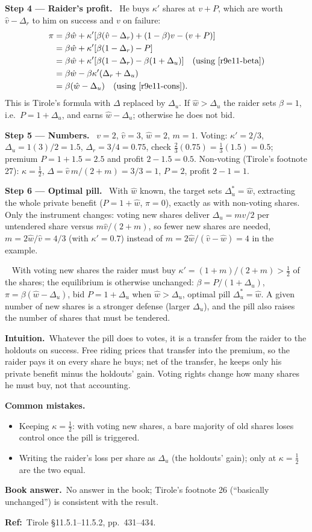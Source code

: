 \documentclass[11pt,a4paper]{article}
\newcommand{\step}[2]{\par\medskip\noindent\textbf{Step #1 --- #2.}~}
\newcommand{\intuition}{\par\medskip\noindent\textbf{Intuition.}~}
\newcommand{\bookans}{\par\medskip\noindent\textbf{Book answer.}~}
\newcommand{\refbib}{\par\smallskip\noindent\textbf{Ref:}~}
\newcommand{\answer}[1]{\par\smallskip\noindent\fbox{\textbf{Answer #1.}}~}
\newcommand{\pitfalls}{\par\medskip\noindent\textbf{Common mistakes.}}
\begin{document}
\step{4}{Raider's profit} He buys $\kappa'$ shares at $v+P$, which are worth $\hat v-\Delta_r$ to him on
success and $v$ on failure:
\begin{align}
  \pi &= \beta\hat w+\kappa'[\beta(\hat v-\Delta_r)+(1-\beta)v-(v+P)] \nonumber\\
      &= \beta\hat w+\kappa'[\beta(1-\Delta_r)-P] \nonumber\\
      &= \beta\hat w+\kappa'[\beta(1-\Delta_r)-\beta(1+\Delta_u)] \quad\text{(using \eqref{r9e11-beta})} \nonumber\\
      &= \beta\hat w-\beta\kappa'(\Delta_r+\Delta_u) \nonumber\\
      &= \beta(\hat w-\Delta_u) \quad\text{(using \eqref{r9e11-cons})}. \label{r9e11-pi}
\end{align}
This is Tirole's formula with $\Delta$ replaced by $\Delta_u$. If $\hat w>\Delta_u$ the raider sets $\beta=1$,
i.e.\ $P=1+\Delta_u$, and earns $\hat w-\Delta_u$; otherwise he does not bid.

\step{5}{Numbers} $v=2$, $\hat v=3$, $\hat w=2$, $m=1$. Voting: $\kappa'=2/3$, $\Delta_u=1(3)/2=1.5$,
$\Delta_r=3/4=0.75$, check $\tfrac23(0.75)=\tfrac13(1.5)=0.5$; premium $P=1+1.5=2.5$ and profit
$2-1.5=0.5$. Non-voting (Tirole's footnote 27): $\kappa=\tfrac12$, $\Delta=\hat v\,m/(2+m)=3/3=1$, $P=2$,
profit $2-1=1$.

\step{6}{Optimal pill} With $\hat w$ known, the target sets $\Delta_u^*=\hat w$, extracting the whole private
benefit ($P=1+\hat w$, $\pi=0$), exactly as with non-voting shares. Only the instrument changes: voting new
shares deliver $\Delta_u=m\hat v/2$ per untendered share versus $m\hat v/(2+m)$, so fewer new shares are needed,
$m=2\hat w/\hat v=4/3$ (with $\kappa'=0.7$) instead of $m=2\hat w/(\hat v-\hat w)=4$ in the example.
\answer{(11.1)} With voting new shares the raider must buy $\kappa'=(1+m)/(2+m)>\tfrac12$ of the shares;
the equilibrium is otherwise unchanged: $\beta=P/(1+\Delta_u)$, $\pi=\beta(\hat w-\Delta_u)$, bid
$P=1+\Delta_u$ when $\hat w>\Delta_u$, optimal pill $\Delta_u^*=\hat w$. A given number of new shares
is a stronger defense (larger $\Delta_u$), and the pill also raises the number of shares that must be tendered.

\intuition Whatever the pill does to votes, it is a transfer from the raider to the holdouts on
success. Free riding prices that transfer into the premium, so the raider pays it on every share he
buys; net of the transfer, he keeps only his private benefit minus the holdouts' gain. Voting rights
change how many shares he must buy, not that accounting.
\pitfalls
\begin{itemize}
  \item Keeping $\kappa=\tfrac12$: with voting new shares, a bare majority of old shares loses control once the pill is triggered.
  \item Writing the raider's loss per share as $\Delta_u$ (the holdouts' gain); only at $\kappa=\tfrac12$ are the two equal.
\end{itemize}
\bookans No answer in the book; Tirole's footnote 26 (``basically unchanged'') is consistent with the result.
\refbib{Tirole \S11.5.1--11.5.2, pp.~431--434.}
\end{document}
